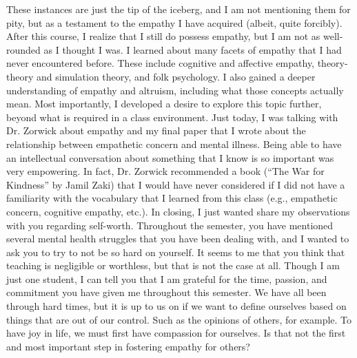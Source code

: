 \documentclass[stu]{apa7}
\begin{document}
	These instances are just the tip of the iceberg, and I am not mentioning them for pity, but as a testament to the empathy I have acquired (albeit, quite forcibly). After this course, I realize that I still do possess empathy, but I am not as well-rounded as I thought I was. I learned about many facets of empathy that I had never encountered before. These include cognitive and affective empathy, theory-theory and simulation theory, and folk psychology. I also gained a deeper understanding of empathy and altruism, including what those concepts actually mean. Most importantly, I developed a desire to explore this topic further, beyond what is required in a class environment.
	Just today, I was talking with Dr. Zorwick about empathy and my final paper that I wrote about the relationship between empathetic concern and mental illness. Being able to have an intellectual conversation about something that I know is so important was very empowering. In fact, Dr. Zorwick recommended a book (``The War for Kindness'' by Jamil Zaki) that I would have never considered if I did not have a familiarity with the vocabulary that I learned from this class (e.g., empathetic concern, cognitive empathy, etc.).
	In closing, I just wanted share my observations with you regarding self-worth. Throughout the semester, you have mentioned several mental health struggles that you have been dealing with, and I wanted to ask you to try to not be so hard on yourself. It seems to me that you think that teaching is negligible or worthless, but that is not the case at all. Though I am just one student, I can tell you that I am grateful for the time, passion, and commitment you have given me throughout this semester. We have all been through hard times, but it is up to us on if we want to define ourselves based on things that are out of our control. Such as the opinions of others, for example. To have joy in life, we must first have compassion for ourselves. Is that not the first and most important step in fostering empathy for others? 
\end{document}
